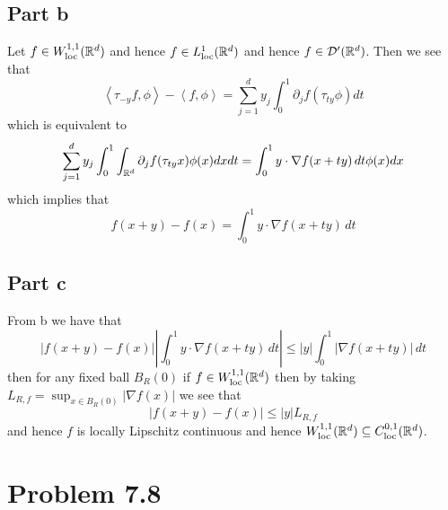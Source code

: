 \documentclass[12pt]{report}
\newcommand{\inner}[2]{\left\langle#1,#2\right\rangle}
\begin{document}
\subsection*{Part b}
Let $f \in W_{\text{loc}}^{1,1}(\mathbb{R}^d)$ and hence $f \in L^1_{\text{loc}}(\mathbb{R}^d)$ and hence $f \in \mathcal{D}'(\mathbb{R}^d)$. Then we see that
\begin{equation*}
  \inner{\tau_{-y}f}{\phi} - \inner{f}{\phi} =\sum_{j=1}^d y_j \int_0^1 \partial_j f(\tau_{ty}\phi) dt
\end{equation*} 
which is equivalent to
\begin{equation*}
  \sum_{j=1}^d y_j \int_0^1 \int_{\mathbb{R}^d} \partial_j f(\tau_{ty}x) \phi(x) dx dt = \int_0^1  y \cdot \nabla f(x + ty) \,dt \phi(x) dx
\end{equation*}
which implies that
\begin{equation*}
  f(x + y) - f(x) = \int_0^1 y \cdot \nabla f(x + ty) \, dt 
\end{equation*}

\subsection*{Part c}
From b we have that
\begin{equation*}
  |f(x+y) - f(x)| \left|\int_0^1 y \cdot \nabla f(x+ty) \, dt\right| \leq |y| \int_0^1 |\nabla f(x+ty)| \, dt
\end{equation*}
then for any fixed ball $B_R(0)$ if $f \in W^{1,1}_{\text{loc}}(\mathbb{R}^d)$ then by taking $L_{R,f} = \sup_{x \in B_R(0)} |\nabla f(x)|$ we see that
\begin{equation*}
  |f(x+y) - f(x)| \leq |y| L_{R,f}
\end{equation*}
and hence $f$ is locally Lipschitz continuous and hence $W^{1,1}_{\text{loc}}(\mathbb{R}^d) \subseteq C^{0,1}_{\text{loc}}(\mathbb{R}^d)$.



\section*{Problem 7.8}
\end{document}
